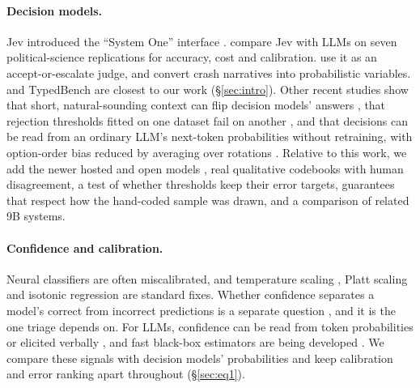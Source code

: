 \paragraph{Decision models.} Jev introduced the ``System One'' interface \citep{typesafe2026jev}. \citet{denney2026jev}
compare Jev with LLMs on seven political-science replications for accuracy, cost and calibration. \citet{li2026jevjudge}
use it as an accept-or-escalate judge, and \citet{rafe2026crash} convert crash narratives into probabilistic variables.
\citet{ibrahim2026decision} and TypedBench \citep{sharma2026typedbench} are closest to our work (\S\ref{sec:intro}). Other
recent studies show that short, natural-sounding context can flip decision models' answers \citep{xu2026jevout}, that
rejection thresholds fitted on one dataset fail on another \citep{lu2026candidate}, and that decisions can be read from an
ordinary LLM's next-token probabilities without retraining, with option-order bias reduced by averaging over rotations
\citep{li2026llmasjev,zhang2026anyjev}. Relative to this work, we add the newer hosted and open models
\citep{openai2026decisions,cloudflare2026clef,perplexity2026decider,palmer2026kev}, real qualitative codebooks with human
disagreement, a test of whether thresholds keep their error targets, guarantees that respect how the hand-coded sample was
drawn, and a comparison of related 9B systems.

\paragraph{Confidence and calibration.} Neural classifiers are often miscalibrated, and temperature scaling
\citep{guo2017calibration}, Platt scaling \citep{platt1999probabilistic} and isotonic regression
\citep{zadrozny2002transforming} are standard fixes. Whether confidence separates a model's correct from incorrect
predictions is a separate question \citep{hendrycks2017baseline}, and it is the one triage depends on. For LLMs, confidence
can be read from token probabilities \citep{kadavath2022language} or elicited verbally \citep{tian2023just,xiong2024can}, and
fast black-box estimators are being developed \citep{hayes2026pinocchio}. We compare these signals with decision models'
probabilities and keep calibration and error ranking apart throughout (\S\ref{sec:eq1}).


